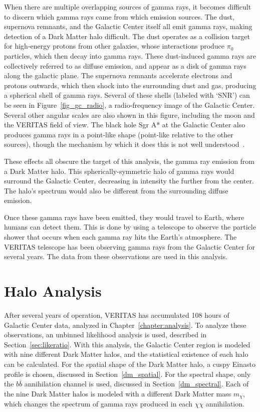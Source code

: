   When there are multiple overlapping sources of gamma rays, it becomes difficult to discern which gamma rays came from which emission sources.
  The dust, supernova remnants, and the Galactic Center itself all emit gamma rays, making detection of a Dark Matter halo difficult.
  The dust operates as a collision target for high-energy protons from other galaxies, whose interactions produce $\pi_0$ particles, which then decay into gamma rays.
  These dust-induced gamma rays are collectively referred to as diffuse emission, and appear as a disk of gamma rays along the galactic plane.
  The supernova remnants accelerate electrons and protons outwards, which then shock into the surrounding dust and gas, producing a spherical shell of gamma rays.
  Several of these shells (labeled with `SNR') can be seen in Figure~\ref{fig_gc_radio}, a radio-frequency image of the Galactic Center.
  Several other angular scales are also shown in this figure, including the moon and the VERITAS field of view.
  The black hole Sgr A* at the Galactic Center also produces gamma rays in a point-like shape (point-like relative to the other sources), though the mechanism by which it does this is not well understood~\cite{gal_cent_still_undetermined}.

  These effects all obscure the target of this analysis, the gamma ray emission from a Dark Matter halo.
  This spherically-symmetric halo of gamma rays would surround the Galactic Center, decreasing in intensity the further from the center.
  The halo's spectrum would also be different from the surrounding diffuse emission.

  Once these gamma rays have been emitted, they would travel to Earth, where humans can detect them.
  This is done by using a telescope to observe the particle shower that occurs when each gamma ray hits the Earth's atmosphere.
  The VERITAS telescope has been observing gamma rays from the Galactic Center for several years.
  The data from these observations are used in this analysis.


\section{Halo Analysis}
  After several years of operation, VERITAS has accumulated 108 hours of Galactic Center data, analyzed in Chapter~\ref{chapter:analysis}.
  To analyze these observations, an unbinned likelihood analysis is used, described in Section~\ref{sec:likeratio}.
  With this analysis, the Galactic Center region is modeled with nine different Dark Matter halos, and the statistical existence of each halo can be calculated.
  For the spatial shape of the Dark Matter halo, a cuspy Einasto profile is chosen, discussed in Section~\ref{dm_spatial}.
  For the spectral shape, only the $b\bar{b}$ annihilation channel is used, discussed in Section~\ref{dm_spectral}.
  Each of the nine Dark Matter halos is modeled with a different Dark Matter mass $m_{\chi}$, which changes the spectrum of gamma rays produced in each $\chi\chi$ annihilation.
  
